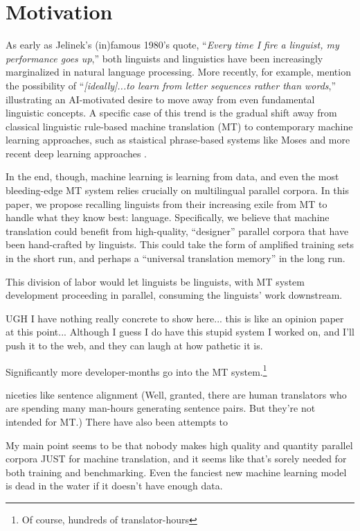 \section{Motivation} %


As early as Jelinek's (in)famous 1980's quote, ``{\em Every time I fire a linguist, my performance goes up},'' both linguists and linguistics have been increasingly marginalized in natural language processing. 
More recently, for example,  mention the possibility of ``{\em [ideally]...to learn from letter sequences rather than words},'' illustrating an AI-motivated desire to move away from even fundamental linguistic concepts.
A specific case of this trend is the gradual shift away from classical linguistic rule-based machine translation (MT)  to  contemporary machine learning approaches, such as staistical phrase-based systems like Moses  and more recent deep learning approaches .

In the end, though, machine learning is learning from data, and even the most bleeding-edge MT system relies crucially on multilingual parallel corpora.  In this paper, we propose recalling linguists from their increasing exile from MT to handle what they know best: language. 
Specifically, we believe that machine translation could benefit from high-quality, ``designer'' parallel corpora that have been hand-crafted by linguists. This could take the form of amplified training sets in the short run, and perhaps a ``universal translation memory'' in the long run.




This division of labor would let linguists be linguists, with MT system development proceeding in parallel, consuming the linguists' work downstream.

UGH I have nothing really concrete to show here... this is like an opinion paper at this point...
Although I guess I do have this stupid system I worked on, and I'll push it to the web, and they can laugh at how pathetic it is.

Significantly more developer-months go into the MT system.\footnote{Of course, hundreds of translator-hours }

niceties like sentence alignment  
(Well, granted, there are human translators who are spending many man-hours generating sentence pairs. But they're not intended for MT.)
There have also been attempts to 

My main point seems to be that nobody makes high quality and quantity parallel corpora JUST for machine translation, and it seems like that's sorely needed for both training and benchmarking.
Even the fanciest new machine learning model is dead in the water if it doesn't have enough data.

